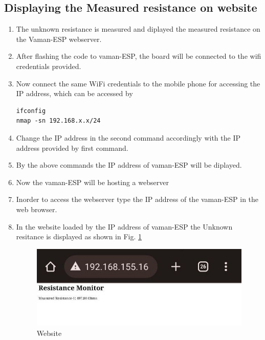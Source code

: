 \subsection{Displaying the Measured resistance on website}
\begin{enumerate}[label=\thesection.\arabic*.,ref=\thesection.\theenumi]
\item The unknown resistance is measured and diplayed the measured resistance on the Vaman-ESP webserver.
\item After flashing the code to vaman-ESP, the board will be connected to the wifi credentials provided.
\item Now connect the same WiFi credentials to the mobile phone for accessing the IP address, which can be accessed by 
\begin{lstlisting}
ifconfig
nmap -sn 192.168.x.x/24
\end{lstlisting}
\item Change the IP address in the second command accordingly with the IP address provided by first command.
\item By the above commands the IP address of vaman-ESP will be diplayed.
\item Now the vaman-ESP will be hosting a webserver
\item Inorder to access the webserver type the IP address of the vaman-ESP in the web browser.
\item In the website loaded by the IP address of vaman-ESP the Unknown resitance is displayed as shown in Fig. \ref{fig:results1}
\begin{figure}[H]
\centering
\includegraphics[width=\columnwidth]{./vaman/vaman-esp/SPI-Resistance/figs/result.jpg}
\caption{Website}
\label{fig:results1}
\end{figure}
\end{enumerate}
